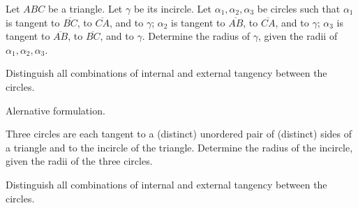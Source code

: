 Let $ABC$ be a triangle.
Let $\gamma$ be its incircle.
Let $\alpha_1, \alpha_2, \alpha_3$ be circles such that
$\alpha_1$ is tangent to $\overline{BC}$, to $\overline{CA}$, and to $\gamma$;
$\alpha_2$ is tangent to $\overline{AB}$, to $\overline{CA}$, and to $\gamma$;
$\alpha_3$ is tangent to $\overline{AB}$, to $\overline{BC}$, and to $\gamma$.
Determine the radius of $\gamma$, given the radii of $\alpha_1, \alpha_2, \alpha_3$.

Distinguish all combinations of internal and external tangency between the circles.

\medskip
Alernative formulation.

Three circles are each tangent to a (distinct) unordered pair of (distinct) sides of a triangle
and to the incircle of the triangle.
Determine the radius of the incircle, given the radii of the three circles.

Distinguish all combinations of internal and external tangency between the circles.
